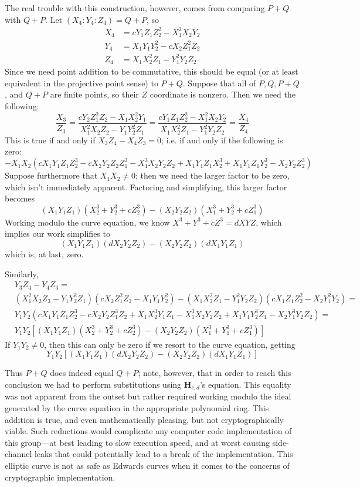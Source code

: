 The real trouble with this construction, however, comes from comparing $P + Q$
    with $Q + P$.
Let $(X_4 : Y_4 : Z_4) = Q + P$, so
\begin{align*}
X_4 &=  cY_1Z_1Z_2^2 - X_1^2X_2Y_2\\
Y_4 &=  X_1Y_1Y_2^2 - cX_2Z_1^2Z_2\\
Z_4 &=  X_1X_2^2Z_1 - Y_1^2Y_2Z_2
\end{align*}
Since we need point addition to be commutative, this should be equal (or at
    least equivalent in the projective point sense) to $P + Q$.
Suppose that all of $P, Q, P + Q$, and $Q + P$ are finite points, so their $Z$
    coordinate is nonzero.
Then we need the following:
\[
\frac{X_3}{Z_3} = \frac{cY_2Z_1^2Z_2 - X_1X_2^2Y_1}{X_1^2X_2Z_2 - Y_1Y_2^2Z_1}
=
\frac{cY_1Z_1Z_2^2 - X_1^2X_2Y_2}{X_1X_2^2Z_1 - Y_1^2Y_2Z_2} = \frac{X_4}{Z_4}
\]
This is true if and only if $X_3Z_4 - X_4Z_3 = 0$; i.e. if and only if the
    following is zero:
\begin{equation}\label{f_j_add}
-X_1X_2\left(cX_1Y_1Z_1Z_2^3 - cX_2Y_2Z_2Z_1^3 - X_1^3X_2Y_2Z_2 +
    X_1Y_1Z_1X_2^3 + X_1Y_1Z_1Y_2^3 - X_2Y_2Z_2^3\right)
\end{equation}
Suppose furthermore that $X_1X_2 \ne 0$; then we need the larger factor to be
    zero, which isn't immediately apparent.
Factoring and simplifying, this larger factor becomes
\[
(X_1Y_1Z_1)(X_2^3 + Y_2^3 + cZ_2^3) - (X_2Y_2Z_2)(X_1^3 + Y_2^3 + cZ_1^3)
\]
Working modulo the curve equation, we know $X^3 + Y^3 + cZ^3 = dXYZ$, which
    implies our work simplifies to
\[
(X_1Y_1Z_1)(dX_2Y_2Z_2) - (X_2Y_2Z_2)(dX_1Y_1Z_1)
\]
    which is, at last, zero.

Similarly,
\begin{align*}
&Y_3Z_4 - Y_4Z_3 =\\
&(X_1^2X_2Z_3 - Y_1Y_2^2Z_1)(cX_2Z_1^2Z_2 - X_1Y_1Y_2^2) -
    (X_1X_2^2Z_1 - Y_1^2Y_2Z_2)(cX_1Z_1Z_2^2 - X_2Y_1^2Y_2) =\\
&Y_1Y_2(cX_1Y_1Z_1Z_2^3 - cX_2Y_2Z_1^3Z_2 + X_1X_2^3Y_1Z_1 - X_1^3X_2Y_2Z_2 +
    X_1Y_1Y_2^3Z_1 - X_2Y_1^3Y_2Z_2) =\\
&Y_1Y_2\left[(X_1Y_1Z_1)(X_2^3 + Y_2^3 + cZ_2^3) - (X_2Y_2Z_2)(X_1^3 + Y_1^3 +
    cZ_1^3)\right]
\end{align*}
If $Y_1Y_2 \ne 0$, then this can only be zero if we resort to the curve
    equation, getting
\[
Y_1Y_2\left[(X_1Y_1Z_1)(dX_2Y_2Z_2) - (X_2Y_2Z_2)(dX_1Y_1Z_1)\right]
\]

Thus $P + Q$ does indeed equal $Q + P$; note, however, that in order to reach
    this conclusion we had to perform substitutions using $\mathbf{H}_{c, d}$'s
    equation.
This equality was not apparent from the outset but rather required working
    modulo the ideal generated by the curve equation in the appropriate
    polynomial ring.
This addition is true, and even mathematically pleasing, but not
    cryptographically viable.
Such reductions would complicate any computer code implementation of this
    group---at best leading to slow execution speed, and at worst causing
    side-channel leaks that could potentially lead to a break of the
    implementation.
This elliptic curve is not as safe as Edwards curves when it comes to the
    concerns of cryptographic implementation.

